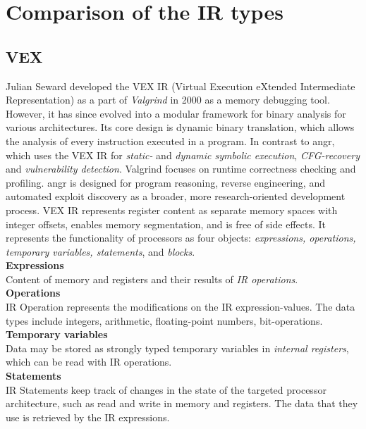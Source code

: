 \documentclass[seminar]{plai}
\begin{document}
\section{Comparison of the IR types}
\label{sec:comparison-of-the-ir-types}

\subsection{VEX}
Julian Seward developed the VEX IR (Virtual Execution eXtended Intermediate Representation) as a part of \textit{Valgrind} in 2000 as a memory debugging tool. However, it has since evolved into a modular framework for binary analysis for various architectures. 
Its core design is dynamic binary translation, which allows the analysis of every instruction executed in a program. In contrast to angr, which uses the VEX IR for \textit{static-} and \textit{dynamic symbolic execution}, \textit{CFG-recovery} and \textit{vulnerability detection}.
Valgrind focuses on runtime correctness checking and profiling.
angr is designed for program reasoning, reverse engineering, and automated exploit discovery as a broader, more research-oriented development process. VEX IR represents register content as separate memory spaces with integer offsets, enables memory segmentation, and is free of side effects. It represents the functionality of processors as four objects: \textit{expressions, operations, temporary variables, statements}, and \textit{blocks}.\cite{Valgrind-A-Framework-for-Heavyweight-Dynamic-Binary-Instrumentation}\\

\noindent\textbf{Expressions}\\
Content of memory and registers and their results of \textit{IR operations}.\\

\noindent\textbf{Operations}\\
IR Operation represents the modifications on the IR expression-values.
The data types include integers, arithmetic, floating-point numbers, bit-operations.\\

\noindent\textbf{Temporary variables}\\
Data may be stored as strongly typed temporary variables in \textit{internal registers}, which can be read with IR operations.\\

\noindent\textbf{Statements}\\
IR Statements keep track of changes in the state of the targeted processor architecture, such as read and write in memory and registers. The data that they use is retrieved by the IR expressions.\\
\end{document}
